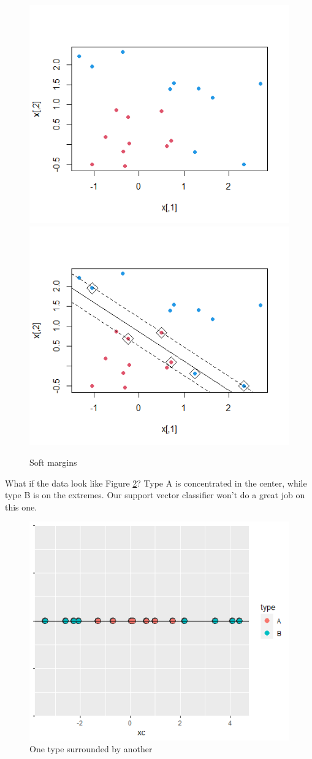 \documentclass[
]{book}
\theoremstyle{definition}
\theoremstyle{definition}
\theoremstyle{definition}
\theoremstyle{definition}
\theoremstyle{remark}
\begin{document}
\begin{figure}

{\centering \includegraphics[width=0.4\linewidth]{images/svd5} \includegraphics[width=0.4\linewidth]{images/svd6} 

}

\caption{Soft margins}\label{fig:svd56}
\end{figure}

What if the data look like Figure \ref{fig:svm8}? Type A is concentrated in the center, while type B is on the extremes. Our support vector classifier won't do a great job on this one.

\begin{figure}

{\centering \includegraphics[width=0.7\linewidth]{images/svm8} 

}

\caption{One type surrounded by another}\label{fig:svm8}
\end{figure}
\end{document}
